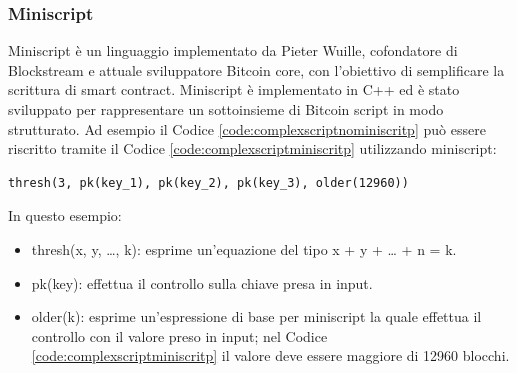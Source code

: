 \subsubsection{Miniscript}

Miniscript è un linguaggio implementato da Pieter Wuille, cofondatore di Blockstream e attuale sviluppatore Bitcoin core, con l'obiettivo di semplificare la scrittura di smart contract.
Miniscript è implementato in C++ ed è stato sviluppato per rappresentare un sottoinsieme di Bitcoin script in modo strutturato. Ad esempio il Codice \ref{code:complexscriptnominiscritp} può essere riscritto tramite il Codice \ref{code:complexscriptminiscritp} utilizzando miniscript:

\begin{lstlisting}[language=miniscript, label={code:complexscriptminiscritp}, caption={Un esempio di utilizzo di miniscript.}]
thresh(3, pk(key_1), pk(key_2), pk(key_3), older(12960))
\end{lstlisting}

In questo esempio:
\begin{itemize}
  \item thresh(x, y, …, k): esprime un'equazione del tipo x + y + … + n = k.
  \item pk(key): effettua il controllo sulla chiave presa in input.
  \item older(k): esprime un'espressione di base per miniscript la quale effettua il controllo con il valore preso in input; nel Codice \ref{code:complexscriptminiscritp} il valore deve essere maggiore di 12960 blocchi.
\end{itemize}

